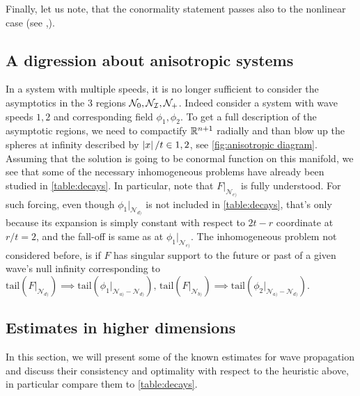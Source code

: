 \documentclass[11pt, oneside]{amsart}
\begin{document}
	Finally, let us note, that the conormality statement passes also to the nonlinear case (see \cite{hintz_semilinear_2015},\cite{hintz_stability_2020}). 

	
	\subsection{A digression about anisotropic systems}\label{anisotropic section}
	In a system with multiple speeds, it is no longer sufficient to consider the asymptotics in the 3 regions $\mathcal{N}_0,\mathcal{N}_{\mathcal{I}},\mathcal{N}_+$. Indeed consider a system with wave speeds $1,2$ and corresponding field $\phi_1,\phi_2$. To get a full description of the asymptotic regions, we need to compactify $\mathbb{R}^{n+1}$ radially and than blow up the spheres at infinity described by $\left\lvert x\right\rvert/t\in{1,2}$, see \cref{fig:anisotropic diagram}. Assuming that the solution is going to be conormal function on this manifold, we see that some of the necessary inhomogeneous problems have already been studied in \cref{table:decays}. In particular, note that $F|_{\mathcal{N}_{e)}}$ is fully understood. For such forcing, even though $\phi_1|_{\mathcal{N}_{d)}}$ is not included in \cref{table:decays}, that's only because its expansion is simply constant with respect to $2t-r$ coordinate at $r/t=2$, and the fall-off is same as at $\phi_1|_{\mathcal{N}_{e)}}$. The inhomogeneous problem not considered before, is if $F$ has singular support to the future or past of a given wave's null infinity corresponding to $\text{tail}(F|_{\mathcal{N}_{d)}})\implies\text{tail}(\phi_1|_{\mathcal{N}_{a)}-\mathcal{N}_{d)}}),\,\text{tail}(F|_{\mathcal{N}_{b)}})\implies\text{tail}(\phi_2|_{\mathcal{N}_{a)}-\mathcal{N}_{d)}})$.

	\begin{figure}[h]
	\end{figure}
	
	\subsection{Estimates in higher dimensions}
	In this section, we will present some of the known estimates for wave propagation and discuss their consistency and optimality with respect to the heuristic above, in particular compare them to \cref{table:decays}.
\end{document}
